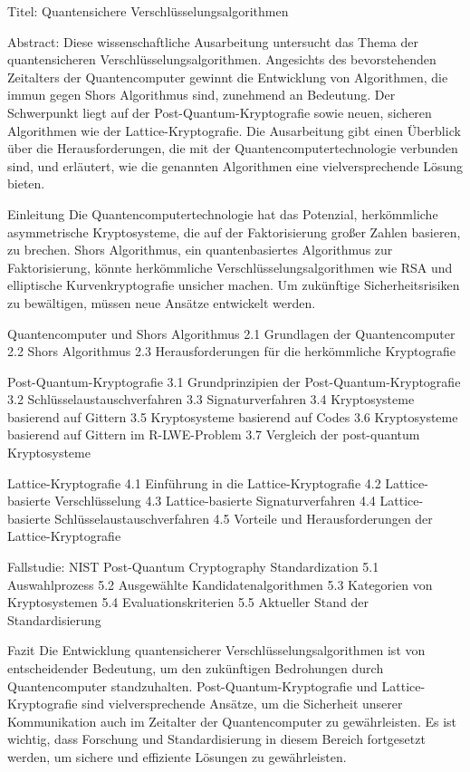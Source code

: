 Titel: Quantensichere Verschlüsselungsalgorithmen

Abstract:
Diese wissenschaftliche Ausarbeitung untersucht das Thema der quantensicheren Verschlüsselungsalgorithmen. Angesichts des bevorstehenden Zeitalters der Quantencomputer gewinnt die Entwicklung von Algorithmen, die immun gegen Shors Algorithmus sind, zunehmend an Bedeutung. Der Schwerpunkt liegt auf der Post-Quantum-Kryptografie sowie neuen, sicheren Algorithmen wie der Lattice-Kryptografie. Die Ausarbeitung gibt einen Überblick über die Herausforderungen, die mit der Quantencomputertechnologie verbunden sind, und erläutert, wie die genannten Algorithmen eine vielversprechende Lösung bieten.

Einleitung
Die Quantencomputertechnologie hat das Potenzial, herkömmliche asymmetrische Kryptosysteme, die auf der Faktorisierung großer Zahlen basieren, zu brechen. Shors Algorithmus, ein quantenbasiertes Algorithmus zur Faktorisierung, könnte herkömmliche Verschlüsselungsalgorithmen wie RSA und elliptische Kurvenkryptografie unsicher machen. Um zukünftige Sicherheitsrisiken zu bewältigen, müssen neue Ansätze entwickelt werden.

Quantencomputer und Shors Algorithmus
2.1 Grundlagen der Quantencomputer
2.2 Shors Algorithmus
2.3 Herausforderungen für die herkömmliche Kryptografie

Post-Quantum-Kryptografie
3.1 Grundprinzipien der Post-Quantum-Kryptografie
3.2 Schlüsselaustauschverfahren
3.3 Signaturverfahren
3.4 Kryptosysteme basierend auf Gittern
3.5 Kryptosysteme basierend auf Codes
3.6 Kryptosysteme basierend auf Gittern im R-LWE-Problem
3.7 Vergleich der post-quantum Kryptosysteme

Lattice-Kryptografie
4.1 Einführung in die Lattice-Kryptografie
4.2 Lattice-basierte Verschlüsselung
4.3 Lattice-basierte Signaturverfahren
4.4 Lattice-basierte Schlüsselaustauschverfahren
4.5 Vorteile und Herausforderungen der Lattice-Kryptografie

Fallstudie: NIST Post-Quantum Cryptography Standardization
5.1 Auswahlprozess
5.2 Ausgewählte Kandidatenalgorithmen
5.3 Kategorien von Kryptosystemen
5.4 Evaluationskriterien
5.5 Aktueller Stand der Standardisierung

Fazit
Die Entwicklung quantensicherer Verschlüsselungsalgorithmen ist von entscheidender Bedeutung, um den zukünftigen Bedrohungen durch Quantencomputer standzuhalten. Post-Quantum-Kryptografie und Lattice-Kryptografie sind vielversprechende Ansätze, um die Sicherheit unserer Kommunikation auch im Zeitalter der Quantencomputer zu gewährleisten. Es ist wichtig, dass Forschung und Standardisierung in diesem Bereich fortgesetzt werden, um sichere und effiziente Lösungen zu gewährleisten.


